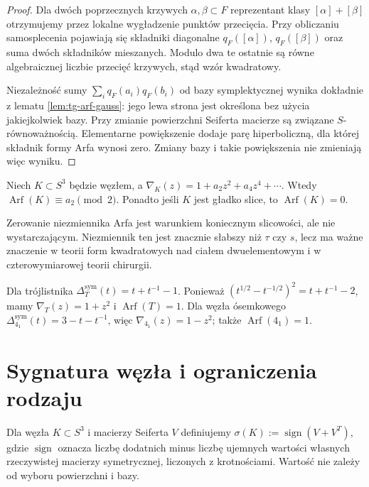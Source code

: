 \begin{proof}
Dla dwóch poprzecznych krzywych $\alpha,\beta\subset F$
reprezentant klasy $[\alpha]+[\beta]$ otrzymujemy przez
lokalne wygładzenie punktów przecięcia. Przy obliczaniu
samosplecenia pojawiają się składniki diagonalne
$q_F([\alpha])$, $q_F([\beta])$ oraz suma dwóch składników
mieszanych. Modulo dwa te ostatnie są równe algebraicznej
liczbie przecięć krzywych, stąd wzór kwadratowy.

Niezależność sumy $\sum_iq_F(a_i)q_F(b_i)$ od bazy
symplektycznej wynika dokładnie z lematu
\ref{lem:tg-arf-gauss}: jego lewa strona jest określona
bez użycia jakiejkolwiek bazy.
Przy zmianie powierzchni Seiferta macierze są związane
$S$-równoważnością. Elementarne powiększenie dodaje parę
hiperboliczną, dla której składnik formy Arfa wynosi zero.
Zmiany bazy i takie powiększenia nie zmieniają więc wyniku.
\end{proof}

\begin{stwierdzenie}
Niech $K\subset S^3$ będzie węzłem, a
$\nabla_K(z)=1+a_2z^2+a_4z^4+\cdots$.
Wtedy $\operatorname{Arf}(K)\equiv a_2\pmod2$.
Ponadto jeśli $K$ jest gładko slice, to
$\operatorname{Arf}(K)=0$.
\end{stwierdzenie}

\begin{uwaga}
Zerowanie niezmiennika Arfa jest warunkiem koniecznym
slicowości, ale nie wystarczającym. Niezmiennik ten
jest znacznie słabszy niż $\tau$ czy $s$, lecz
ma ważne znaczenie w teorii form kwadratowych
nad ciałem dwuelementowym i w czterowymiarowej
teorii chirurgii.
\end{uwaga}

\begin{przyklad}
Dla trójlistnika
$\Delta_T^{\mathrm{sym}}(t)=t+t^{-1}-1$.
Ponieważ
$(t^{1/2}-t^{-1/2})^2=t+t^{-1}-2$,
mamy $\nabla_T(z)=1+z^2$ i
$\operatorname{Arf}(T)=1$.
Dla węzła ósemkowego
$\Delta_{4_1}^{\mathrm{sym}}(t)=3-t-t^{-1}$,
więc $\nabla_{4_1}(z)=1-z^2$;
także $\operatorname{Arf}(4_1)=1$.
\end{przyklad}


\section{Sygnatura węzła i ograniczenia rodzaju}
\label{sec:kt-sygnatura}

\begin{definicja}
Dla węzła $K\subset S^3$ i macierzy Seiferta $V$ definiujemy
$\sigma(K):=\operatorname{sign}(V+V^T)$,
gdzie $\operatorname{sign}$ oznacza liczbę dodatnich minus liczbę
ujemnych wartości własnych rzeczywistej macierzy symetrycznej,
liczonych z krotnościami. Wartość nie zależy od wyboru
powierzchni i bazy.
\end{definicja}

